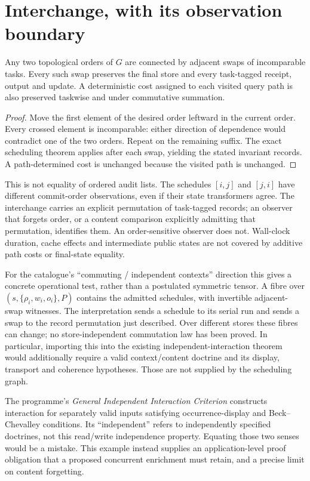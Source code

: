 \documentclass[11pt]{article}
\begin{document}
\section{Interchange, with its observation boundary}
\begin{proposition}
Any two topological orders of $G$ are connected by adjacent swaps of incomparable tasks. Every such swap preserves the final store and every task-tagged receipt, output and update. A deterministic cost assigned to each visited query path is also preserved taskwise and under commutative summation.
\end{proposition}
\begin{proof}
Move the first element of the desired order leftward in the current order. Every crossed element is incomparable: either direction of dependence would contradict one of the two orders. Repeat on the remaining suffix. The exact scheduling theorem applies after each swap, yielding the stated invariant records. A path-determined cost is unchanged because the visited path is unchanged.
\end{proof}
This is not equality of ordered audit lists. The schedules $[i,j]$ and $[j,i]$ have different commit-order observations, even if their state transformers agree. The interchange carries an explicit permutation of task-tagged records; an observer that forgets order, or a content comparison explicitly admitting that permutation, identifies them. An order-sensitive observer does not. Wall-clock duration, cache effects and intermediate public states are not covered by additive path costs or final-state equality.

For the catalogue's ``commuting / independent contexts'' direction this gives a concrete operational test, rather than a postulated symmetric tensor. A fibre over $(s,\{\rho_i,w_i,o_i\},P)$ contains the admitted schedules, with invertible adjacent-swap witnesses. The interpretation sends a schedule to its serial run and sends a swap to the record permutation just described. Over different stores these fibres can change; no store-independent commutation law has been proved. In particular, importing this into the existing independent-interaction theorem would additionally require a valid context/content doctrine and its display, transport and coherence hypotheses. Those are not supplied by the scheduling graph.

The programme's \emph{General Independent Interaction Criterion} constructs interaction for separately valid inputs satisfying occurrence-display and Beck--Chevalley conditions. Its ``independent'' refers to independently specified doctrines, not this read/write independence property. Equating those two senses would be a mistake. This example instead supplies an application-level proof obligation that a proposed concurrent enrichment must retain, and a precise limit on content forgetting.
\end{document}

